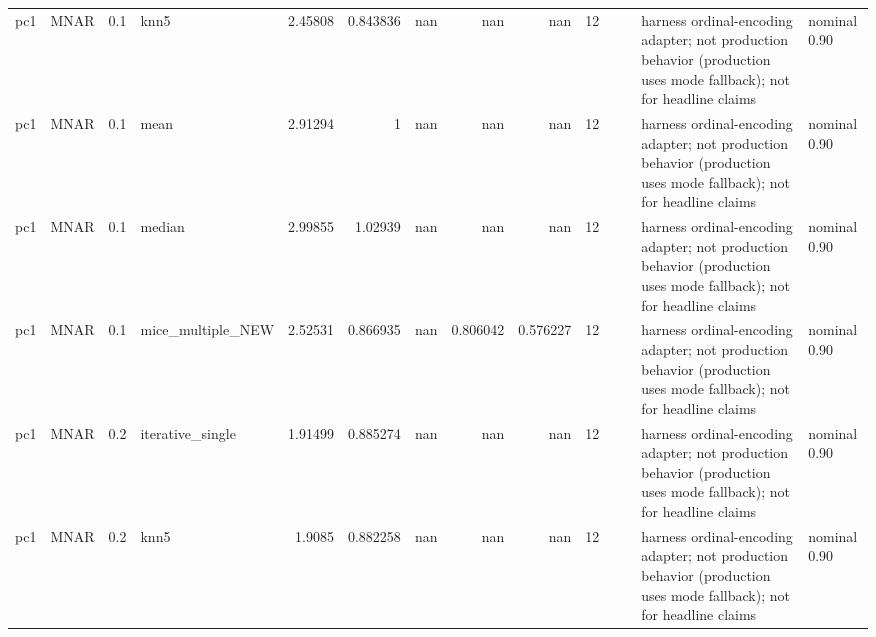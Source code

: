 \begin{table}[ht]
\begin{tabular}{llrlrrrrrrllll}
 pc1                  & MNAR        &         0.1 & knn5              &       2.45808  &             0.843836 &               nan        &                     nan        &                       nan        &        12 &                    &                                         & harness ordinal-encoding adapter; not production behavior (production uses mode fallback); not for headline claims & nominal 0.90              \\
 pc1                  & MNAR        &         0.1 & mean              &       2.91294  &             1        &               nan        &                     nan        &                       nan        &        12 &                    &                                         & harness ordinal-encoding adapter; not production behavior (production uses mode fallback); not for headline claims & nominal 0.90              \\
 pc1                  & MNAR        &         0.1 & median            &       2.99855  &             1.02939  &               nan        &                     nan        &                       nan        &        12 &                    &                                         & harness ordinal-encoding adapter; not production behavior (production uses mode fallback); not for headline claims & nominal 0.90              \\
 pc1                  & MNAR        &         0.1 & mice\_multiple\_NEW &       2.52531  &             0.866935 &               nan        &                       0.806042 &                         0.576227 &        12 &                    &                                         & harness ordinal-encoding adapter; not production behavior (production uses mode fallback); not for headline claims & nominal 0.90              \\
 pc1                  & MNAR        &         0.2 & iterative\_single  &       1.91499  &             0.885274 &               nan        &                     nan        &                       nan        &        12 &                    &                                         & harness ordinal-encoding adapter; not production behavior (production uses mode fallback); not for headline claims & nominal 0.90              \\
 pc1                  & MNAR        &         0.2 & knn5              &       1.9085   &             0.882258 &               nan        &                     nan        &                       nan        &        12 &                    &                                         & harness ordinal-encoding adapter; not production behavior (production uses mode fallback); not for headline claims & nominal 0.90              \\

\end{tabular}
\end{table}

